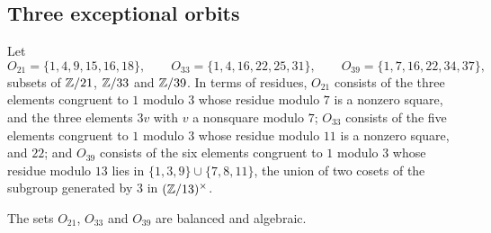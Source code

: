 \subsection{Three exceptional orbits}
Let
\[
  O_{21}=\{1,4,9,15,16,18\},\qquad O_{33}=\{1,4,16,22,25,31\},\qquad
  O_{39}=\{1,7,16,22,34,37\},
\]
subsets of $\mathbb{Z}/21$, $\mathbb{Z}/33$ and $\mathbb{Z}/39$. In terms of residues, $O_{21}$
consists of the three elements congruent to $1$ modulo $3$ whose residue
modulo $7$ is a nonzero square, and the three elements $3v$ with $v$ a
nonsquare modulo $7$; $O_{33}$ consists of the five elements congruent to
$1$ modulo $3$ whose residue modulo $11$ is a nonzero square, and $22$; and
$O_{39}$ consists of the six elements congruent to $1$ modulo $3$ whose
residue modulo $13$ lies in $\{1,3,9\}\cup\{7,8,11\}$, the union of two
cosets of the subgroup generated by $3$ in $(\mathbb{Z}/13)^{\times}$.

\begin{lemma}\label{lem:exceptional}
The sets $O_{21}$, $O_{33}$ and $O_{39}$ are balanced and algebraic.
\end{lemma}

